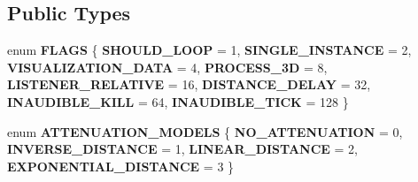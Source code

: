 \subsection*{Public Types}
\begin{DoxyCompactItemize}
\item 
\mbox{\label{class_so_loud_1_1_audio_source_a0c2eb0c2736920eafe2f178a15a5ee3b}} 
enum {\bfseries F\+L\+A\+GS} \{ \newline
{\bfseries S\+H\+O\+U\+L\+D\+\_\+\+L\+O\+OP} = 1, 
{\bfseries S\+I\+N\+G\+L\+E\+\_\+\+I\+N\+S\+T\+A\+N\+CE} = 2, 
{\bfseries V\+I\+S\+U\+A\+L\+I\+Z\+A\+T\+I\+O\+N\+\_\+\+D\+A\+TA} = 4, 
{\bfseries P\+R\+O\+C\+E\+S\+S\+\_\+3D} = 8, 
\newline
{\bfseries L\+I\+S\+T\+E\+N\+E\+R\+\_\+\+R\+E\+L\+A\+T\+I\+VE} = 16, 
{\bfseries D\+I\+S\+T\+A\+N\+C\+E\+\_\+\+D\+E\+L\+AY} = 32, 
{\bfseries I\+N\+A\+U\+D\+I\+B\+L\+E\+\_\+\+K\+I\+LL} = 64, 
{\bfseries I\+N\+A\+U\+D\+I\+B\+L\+E\+\_\+\+T\+I\+CK} = 128
 \}
\item 
\mbox{\label{class_so_loud_1_1_audio_source_a8ded5e82ef73b03400178f7cb591b9fb}} 
enum {\bfseries A\+T\+T\+E\+N\+U\+A\+T\+I\+O\+N\+\_\+\+M\+O\+D\+E\+LS} \{ {\bfseries N\+O\+\_\+\+A\+T\+T\+E\+N\+U\+A\+T\+I\+ON} = 0, 
{\bfseries I\+N\+V\+E\+R\+S\+E\+\_\+\+D\+I\+S\+T\+A\+N\+CE} = 1, 
{\bfseries L\+I\+N\+E\+A\+R\+\_\+\+D\+I\+S\+T\+A\+N\+CE} = 2, 
{\bfseries E\+X\+P\+O\+N\+E\+N\+T\+I\+A\+L\+\_\+\+D\+I\+S\+T\+A\+N\+CE} = 3
 \}
\end{DoxyCompactItemize}
